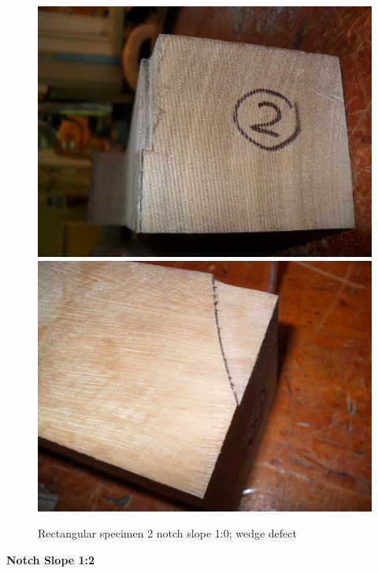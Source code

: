 \documentclass[11pt,a4paper]{article}
\numberwithin{equation}{subsection}
\begin{document}
\begin{figure}[h]
	\begin{center}
		\includegraphics[scale=0.065]{End_wedge}
		\includegraphics[scale=0.065]{Top_wedge}
	\end{center}
	\caption{Rectangular specimen 2 notch slope 1:0; wedge defect}
	\label{fig:Rect_2_wedge}
\end{figure}

\pagebreak

\noindent
\textbf{Notch Slope 1:2}\par
\noindent
\end{document}
